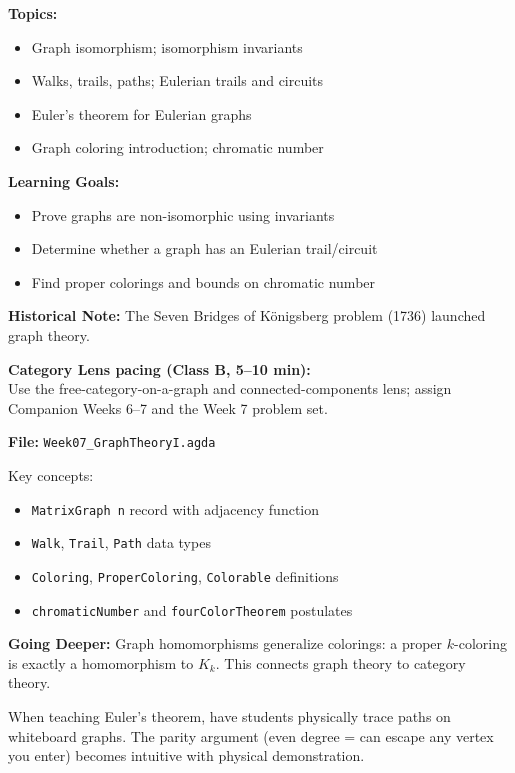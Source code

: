 \documentclass[11pt]{article}
\begin{document}
\begin{classbbox}
\textbf{Topics:}
\begin{itemize}
    \item Graph isomorphism; isomorphism invariants
    \item Walks, trails, paths; Eulerian trails and circuits
    \item Euler's theorem for Eulerian graphs
    \item Graph coloring introduction; chromatic number
\end{itemize}

\textbf{Learning Goals:}
\begin{itemize}
    \item Prove graphs are non-isomorphic using invariants
    \item Determine whether a graph has an Eulerian trail/circuit
    \item Find proper colorings and bounds on chromatic number
\end{itemize}

\textbf{Historical Note:} The Seven Bridges of K\"onigsberg problem (1736) launched graph theory.
\end{classbbox}

\textbf{Category Lens pacing (Class B, 5--10 min):}\\
Use the free-category-on-a-graph and connected-components lens; assign Companion Weeks 6--7 and the Week 7 problem set.

\begin{agdabox}
\textbf{File:} \texttt{Week07\_GraphTheoryI.agda}

Key concepts:
\begin{itemize}
    \item \texttt{MatrixGraph n} record with adjacency function
    \item \texttt{Walk}, \texttt{Trail}, \texttt{Path} data types
    \item \texttt{Coloring}, \texttt{ProperColoring}, \texttt{Colorable} definitions
    \item \texttt{chromaticNumber} and \texttt{fourColorTheorem} postulates
\end{itemize}

\textbf{Going Deeper:} Graph homomorphisms generalize colorings: a proper $k$-coloring is exactly a homomorphism to $K_k$. This connects graph theory to category theory.
\end{agdabox}

\begin{tipbox}
When teaching Euler's theorem, have students physically trace paths on whiteboard graphs. The parity argument (even degree = can escape any vertex you enter) becomes intuitive with physical demonstration.
\end{tipbox}
\end{document}
